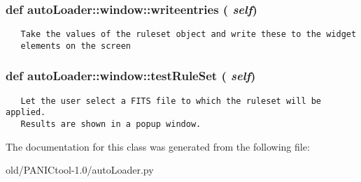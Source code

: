 \subsubsection{\setlength{\rightskip}{0pt plus 5cm}def auto\-Loader::window::writeentries ( {\em self})}\label{classautoLoader_1_1window_78a8f457e9da084ff07da3f804395d70}




\footnotesize\begin{verbatim}
   Take the values of the ruleset object and write these to the widget
   elements on the screen
\end{verbatim}
\normalsize
\subsubsection{\setlength{\rightskip}{0pt plus 5cm}def auto\-Loader::window::test\-Rule\-Set ( {\em self})}\label{classautoLoader_1_1window_db7269382b63a9072dcda500e6013ec1}




\footnotesize\begin{verbatim}
   Let the user select a FITS file to which the ruleset will be applied.
   Results are shown in a popup window.
\end{verbatim}
\normalsize
 

The documentation for this class was generated from the following file:\begin{CompactItemize}
\item 
old/PANICtool-1.0/auto\-Loader.py\end{CompactItemize}
